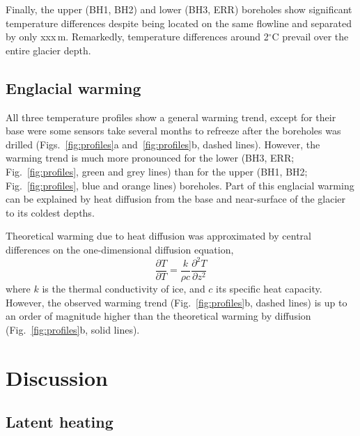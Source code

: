 \documentclass[utf8]{article}
\begin{document}
    Finally, the upper (BH1, BH2) and lower (BH3, ERR) boreholes show
    significant temperature differences despite being located on the same
    flowline and separated by only xxx\,m. Remarkedly, temperature differences
    around 2$^\circ$C prevail over the entire glacier depth.


\subsection{Englacial warming}

    All three temperature profiles show a general warming trend, except for
    their base were some sensors take several months to refreeze after the
    boreholes was drilled (Figs.~\ref{fig:profiles}a and~\ref{fig:profiles}b,
    dashed lines). However, the warming trend is much more pronounced for the
    lower (BH3, ERR; Fig.~\ref{fig:profiles}, green and grey lines) than for
    the upper (BH1, BH2; Fig.~\ref{fig:profiles}, blue and orange lines)
    boreholes. Part of this
    englacial warming can be explained by heat diffusion from the base and
    near-surface of the glacier to its coldest depths.

    Theoretical warming due to heat diffusion was approximated by central
    differences on the one-dimensional diffusion equation,
    \begin{equation}
      \frac{\partial T}{\partial T} =
        \frac{k}{\rho c} \frac{\partial^2 T}{\partial z^2}
    \end{equation}
    where $k$ is the thermal conductivity of ice, and $c$ its specific heat
    capacity. However, the observed warming trend (Fig.~\ref{fig:profiles}b,
    dashed lines) is up to an order of magnitude higher than the theoretical
    warming by diffusion (Fig.~\ref{fig:profiles}b, solid lines).


\section{Discussion}

\subsection{Latent heating}
\end{document}
